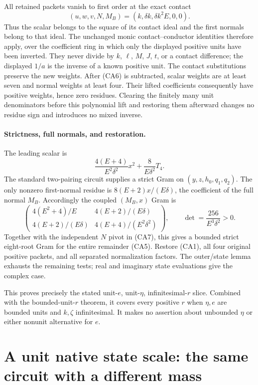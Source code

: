 All retained packets vanish to first order at the exact contact
\[ (u,w,v,N,M_B)=(k,\delta k,\delta k^2E,0,0). \]
Thus the scalar belongs to the square of its contact ideal and the
first normals belong to that ideal. The unchanged monic
contact--conductor identities therefore apply, over the coefficient
ring in which only the displayed positive units have been inverted.
They never divide by $k$, $\ell$, $M$, $J$, $t$, or a contact difference;
the displayed $1/a$ is the inverse of a known positive unit.
The contact substitutions preserve the new weights. After (CA6) is
subtracted, scalar weights are at least seven and normal weights at
least four. Their lifted coefficients consequently have positive
weights, hence zero residues. Clearing the finitely many unit
denominators before this polynomial lift and restoring them afterward
changes no residue sign and introduces no mixed inverse.

\paragraph{Strictness, full normals, and restoration.}
The leading scalar is
\[
 \frac{4(E+4)}{E^2\delta^2}x^2+\frac8{E\delta^2}T_4.
\]
The standard two-pairing circuit supplies a strict Gram on
$(y,z,h_0,q_1,q_2)$. The only nonzero first-normal residue is
$8(E+2)x/(E\delta)$, the coefficient of the full normal $M_B$.
Accordingly the coupled $(M_B,x)$ Gram is
\[
 \begin{pmatrix}
 4(E^2+4)/E&4(E+2)/(E\delta)\\
 4(E+2)/(E\delta)&4(E+4)/(E^2\delta^2)
 \end{pmatrix},\qquad
 \det=\frac{256}{E^3\delta^2}>0.                      \tag{CA8}
\]
Together with the independent $N$ pivot in (CA7), this gives a
bounded strict eight-root Gram for the entire remainder (CA5).
Restore (CA1), all four original positive packets, and all separated
normalization factors. The outer/state lemma exhausts the remaining
tests; real and imaginary state evaluations give the complex case.

This proves precisely the stated unit-$e$, unit-$\eta$,
infinitesimal-$r$ slice. Combined with the bounded-unit-$r$ theorem,
it covers every positive $r$ when $\eta,e$ are bounded units and
$k,\zeta$ infinitesimal. It makes no assertion about unbounded
$\eta$ or either nonunit alternative for $e$.


\section{\texorpdfstring{A unit native state scale: the same circuit with a different mass}{A unit native state scale: the same circuit with a different mass}}
\label{component:p890eea5f538b}


